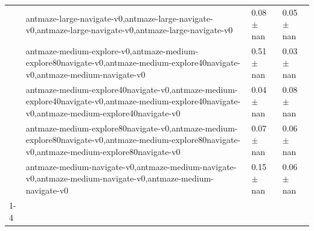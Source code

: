 \begin{tabular}{llll}
 & antmaze-large-navigate-v0,antmaze-large-navigate-v0,antmaze-large-navigate-v0,antmaze-large-navigate-v0 & 0.08 $\pm$ nan & 0.05 $\pm$ nan \\
 & antmaze-medium-explore-v0,antmaze-medium-explore80navigate-v0,antmaze-medium-explore40navigate-v0,antmaze-medium-navigate-v0 & 0.51 $\pm$ nan & 0.03 $\pm$ nan \\
 & antmaze-medium-explore40navigate-v0,antmaze-medium-explore40navigate-v0,antmaze-medium-explore40navigate-v0,antmaze-medium-explore40navigate-v0 & 0.04 $\pm$ nan & 0.08 $\pm$ nan \\
 & antmaze-medium-explore80navigate-v0,antmaze-medium-explore80navigate-v0,antmaze-medium-explore80navigate-v0,antmaze-medium-explore80navigate-v0 & 0.07 $\pm$ nan & 0.06 $\pm$ nan \\
 & antmaze-medium-navigate-v0,antmaze-medium-navigate-v0,antmaze-medium-navigate-v0,antmaze-medium-navigate-v0 & 0.15 $\pm$ nan & 0.06 $\pm$ nan \\
\cline{1-4}
\bottomrule
\end{tabular}
